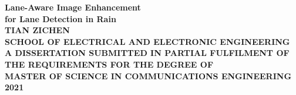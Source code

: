 \begin{titlepage}
\begin{center}
\vspace*{2in}
\Huge{\textbf{Lane-Aware Image Enhancement\\for Lane Detection in Rain}}\\[2.5in]

\LARGE{\textbf{\MakeUppercase{TIAN ZICHEN}}}\\[1in]

\normalsize{\textbf{\MakeUppercase{SCHOOL OF ELECTRICAL AND ELECTRONIC ENGINEERING}}}\\[0.5in]
\normalsize{\textbf{\MakeUppercase{A DISSERTATION SUBMITTED IN PARTIAL FULFILMENT OF\\THE REQUIREMENTS FOR THE DEGREE OF\\MASTER OF SCIENCE IN COMMUNICATIONS ENGINEERING}}}\\[0.75in]


\large{\textbf{2021}}
\end{center}
\end{titlepage}
\newpage